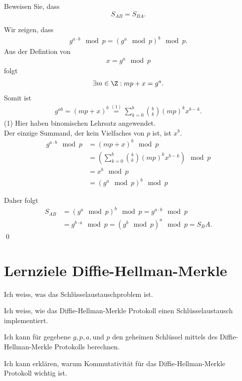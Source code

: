 \begin{mychallenge}\label{ex:DHMBeweis}
	Beweisen Sie, dass $$S_{AB} = S_{BA}.$$ 

	\begin{myanswer}
		Wir zeigen, dass \begin{align*} g^{a\cdot b}\mod p = (g^a\mod p)^b\mod p.\end{align*}
		Aus der Defintion von \begin{align*}x=g^a \mod p\end{align*} folgt 
			\begin{align*} \exists m\in \Z : mp + x = g^a.\end{align*}
		Somit ist 
			\begin{align*}g^{ab}=(mp+x)^b \overset{(1)}{=}\sum_{k=0}^b {b\choose k} (mp)^kx^{b-k}.\end{align*} 
		(1) Hier haben binomischen Lehrsatz angewendet. \\
		Der einzige Summand, der kein Vielfaches von $p$ ist, ist $x^b$.
		\begin{align*}
			g^{a\cdot b} \mod p &=(mp+x)^b\mod p \\ &= \left(\sum_{k=0}^b {b\choose k} (mp)^kx^{b-k}  \right)\mod p \\ &= x^b \mod p \\ &= (g^a \mod p)^b \mod p
		\end{align*}

		Daher folgt
		\begin{align*}
			S_{AB}&=(g^a\mod p)^b\mod p = g^{a\cdot b}\mod p \\&= g^{b\cdot a}\mod p = (g^b \mod p)^a\mod p = S_BA.
		\end{align*}\qed
	\end{myanswer}
\end{mychallenge}

\section{Lernziele Diffie-Hellman-Merkle}

\begin{todolist}
  \item Ich weiss, was das Schlüsselaustauschproblem ist.
  \item Ich weiss, wie das Diffie-Hellman-Merkle Protokoll einen Schlüsselaustausch implementiert. 
  \item Ich kann für gegebene $g, p, a, \text{und } p$ den geheimen Schlüssel mittels des Diffie-Hellman-Merkle Protokolls berechnen.
  \item Ich kann erklären, warum Kommutativität für das Diffie-Hellman-Merkle Protokoll wichtig ist.
\end{todolist}

